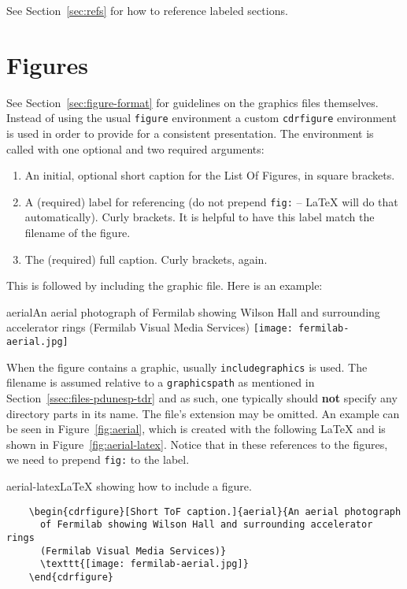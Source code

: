 See Section~\ref{sec:refs} for how to reference labeled sections.

\FloatBarrier

\section{Figures}
\label{sec:figures}

See Section~\ref{sec:figure-format} for guidelines on the graphics files themselves.
Instead of using the usual \texttt{figure} environment a custom \texttt{cdrfigure}
environment is used in order to provide for a consistent presentation.
The environment is called with one optional and two required
arguments:

\begin{enumerate}
\item An initial, optional short caption for the List Of Figures, in square brackets.
\item A (required) label for referencing (do not prepend \texttt{fig:} --  \LaTeX{} will do that automatically). Curly brackets. It is helpful to have this label match the filename of the figure. 
\item The (required) full caption. Curly brackets, again.
\end{enumerate}

This is followed by including the graphic file. Here is an example:

\begin{cdrfigure}{aerial}{An aerial photograph of Fermilab
    showing Wilson Hall and surrounding accelerator rings (Fermilab
    Visual Media Services)}
  \texttt{[image: fermilab-aerial.jpg]}
\end{cdrfigure}


When the figure contains a graphic,  usually \texttt{includegraphics} is used.
The filename is assumed relative to a \texttt{graphicspath} as
mentioned in Section~\ref{ssec:files-pdunesp-tdr} and as such, one typically should
\textbf{not} specify any directory parts in its name.
The file's extension may be omitted.
An example can be seen in Figure~\ref{fig:aerial}, which is created
with the following \LaTeX{} and is shown in Figure~\ref{fig:aerial-latex}.  Notice that in these references to the figures, we need to prepend \texttt{fig:} to the label.

\begin{cdrfigure}[]{aerial-latex}{\LaTeX{} showing how to include a figure.}

\begin{verbatim}
    \begin{cdrfigure}[Short ToF caption.]{aerial}{An aerial photograph
      of Fermilab showing Wilson Hall and surrounding accelerator rings 
      (Fermilab Visual Media Services)}
      \texttt{[image: fermilab-aerial.jpg]}
    \end{cdrfigure}
\end{verbatim}

\end{cdrfigure}

